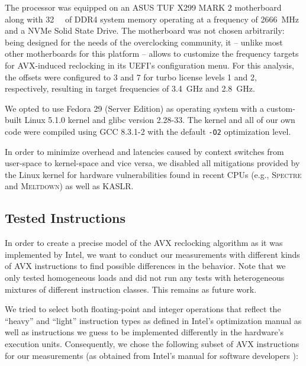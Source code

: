The processor was equipped on an ASUS TUF X299 MARK 2 motherboard along with \SI{32}{\gibi\byte} of DDR4 system memory operating at a frequency of \SI{2666}{\mega\hertz} and a \gls{NVMe} Solid State Drive. The motherboard was not chosen arbitrarily: being designed for the needs of the overclocking community, it -- unlike most other motherboards for this platform -- allows to customize the frequency targets for \gls{AVX}-induced reclocking in its \gls{UEFI}'s configuration menu. For this analysis, the offsets were configured to 3 and 7 for turbo license levels 1 and 2, respectively, resulting in target frequencies of \SI{3.4}{\giga\hertz} and \SI{2.8}{\giga\hertz}.

We opted to use Fedora 29 (Server Edition) as operating system with a custom-built Linux 5.1.0 kernel and glibc version 2.28-33. The kernel and all of our own code were compiled using GCC 8.3.1-2 with the default \texttt{-O2} optimization level.

In order to minimize overhead and latencies caused by context switches from user-space to kernel-space and vice versa, we disabled all mitigations provided by the Linux kernel for hardware vulnerabilities found in recent \glspl{CPU} (e.g., \textsc{Spectre} and \textsc{Meltdown}) as well as \gls{KASLR}.

\subsection{Tested Instructions}
\label{sec:analysis:results:testedinstructions}

In order to create a precise model of the \gls{AVX} reclocking algorithm as it was implemented by Intel, we want to conduct our measurements with different kinds of \gls{AVX} instructions to find possible differences in the behavior. Note that we only tested homogeneous loads and did not run any tests with heterogeneous mixtures of different instruction classes. This remains as future work.

We tried to select both floating-point and integer operations that reflect the \enquote{heavy} and \enquote{light} instruction types as defined in Intel's optimization manual \cite{inteloptimizationmanual} as well as instructions we guess to be implemented differently in the hardware's execution units. Consequently, we chose the following subset of \gls{AVX} instructions for our measurements (as obtained from Intel's manual for software developers \cite{intelsdminstructionreference}):


